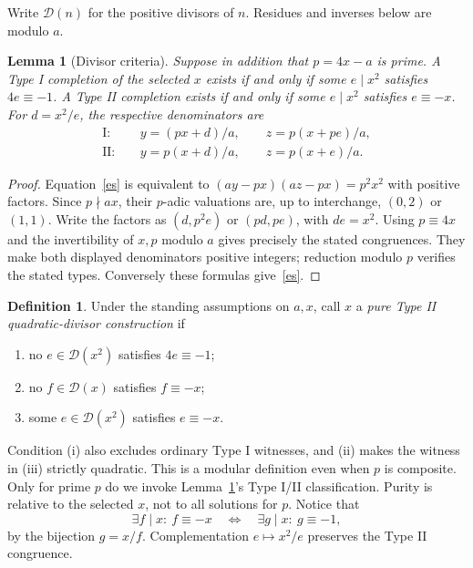 \documentclass[11pt,a4paper]{article}
\newtheorem{lemma}[theorem]{Lemma}
\theoremstyle{definition}\newtheorem{definition}[theorem]{Definition}
\newcommand{\D}{\mathcal D}
\newcommand{\I}{\mathrm I}
\newcommand{\II}{\mathrm {II}}
\begin{document}
Write $\D(n)$ for the positive divisors of $n$. Residues and inverses below are modulo $a$.
\begin{lemma}[Divisor criteria]\label{divisor}
Suppose in addition that $p=4x-a$ is prime. A Type I completion of the selected $x$ exists if and only if some $e\mid x^2$ satisfies $4e\equiv-1$. A Type II completion exists if and only if some $e\mid x^2$ satisfies $e\equiv-x$. For $d=x^2/e$, the respective denominators are
\begin{align}
\I:\quad& y=(px+d)/a,\qquad z=p(x+pe)/a,\label{typeI}\\
\II:\quad& y=p(x+d)/a,\qquad z=p(x+e)/a.\label{typeII}
\end{align}
\end{lemma}
\begin{proof}
Equation~\eqref{es} is equivalent to $(ay-px)(az-px)=p^2x^2$ with positive factors. Since $p\nmid ax$, their $p$-adic valuations are, up to interchange, $(0,2)$ or $(1,1)$. Write the factors as $(d,p^2e)$ or $(pd,pe)$, with $de=x^2$. Using $p\equiv4x$ and the invertibility of $x,p$ modulo $a$ gives precisely the stated congruences. They make both displayed denominators positive integers; reduction modulo $p$ verifies the stated types. Conversely these formulas give~\eqref{es}.
\end{proof}

\begin{definition}\label{def}
Under the standing assumptions on $a,x$, call $x$ a \emph{pure Type II quadratic-divisor construction} if
\begin{enumerate}[label=(\roman*)]
\item no $e\in\D(x^2)$ satisfies $4e\equiv-1$;
\item no $f\in\D(x)$ satisfies $f\equiv-x$;
\item some $e\in\D(x^2)$ satisfies $e\equiv-x$.
\end{enumerate}
\end{definition}
Condition (i) also excludes ordinary Type I witnesses, and (ii) makes the witness in (iii) strictly quadratic. This is a modular definition even when $p$ is composite. Only for prime $p$ do we invoke Lemma~\ref{divisor}'s Type I/II classification. Purity is relative to the selected $x$, not to all solutions for $p$. Notice that
\begin{equation}\label{ordinary}
\exists f\mid x:\ f\equiv-x
\quad\Longleftrightarrow\quad
\exists g\mid x:\ g\equiv-1,
\end{equation}
by the bijection $g=x/f$. Complementation $e\mapsto x^2/e$ preserves the Type II congruence.
\end{document}
